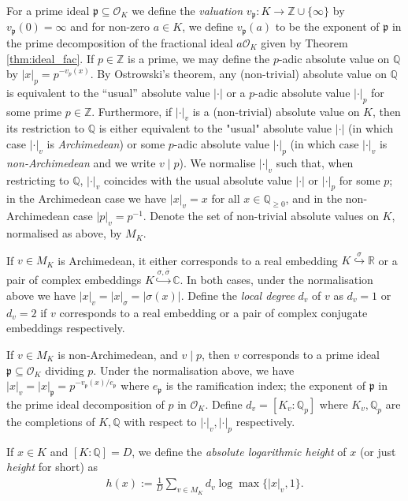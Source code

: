 \documentclass{article}\usepackage[a4paper,margin=20mm]{geometry}
\newcommand{\Q}{\mathbb{Q}}
\newcommand{\p}{\mathfrak{p}}
\newcommand{\Z}{\mathbb{Z}}
\renewcommand{\O}{\mathcal{O}}
\begin{document}
 For a prime ideal $\p \subseteq \O_K$ we define the \emph{valuation} $v_\p : K \to \Z \cup \{\infty\}$ by $v_\p(0) = \infty$ and for non-zero $a \in K$, we define $v_\p(a)$ to be the exponent of $\p$ in the prime decomposition of the fractional ideal $a\O_K$ given by Theorem \ref{thm:ideal_fac}. If $p \in \mathbb Z$ is a prime, we may define the $p$-adic absolute value on $\mathbb Q$ by $|x|_p = p^{-v_p(x)}$. By Ostrowski's theorem, any (non-trivial) absolute value on $\Q$ is equivalent to the ``usual'' absolute value $|\cdot|$ or a $p$-adic absolute value $|\cdot|_p$ for some prime $p \in \Z$. Furthermore, if $|\cdot|_v$ is a (non-trivial) absolute value on $K$, then its restriction to $\Q$ is either equivalent to the "usual" absolute value $|\cdot|$ (in which case $|\cdot|_v$ is \emph{Archimedean}) or some $p$-adic absolute value $|\cdot|_p$ (in which case $|\cdot|_v$ is \emph{non-Archimedean} and we write $v \mid p$). We normalise $|\cdot|_v$ such that, when restricting to $\Q$, $|\cdot|_v$ coincides with the usual absolute value $|\cdot|$ or $|\cdot|_p$ for some $p$; in the Archimedean case we have $|x|_v = x$ for all $x \in \Q_{\geq 0}$, and in the non-Archimedean case $|p|_v = p^{-1}$. Denote the set of non-trivial absolute values on $K$, normalised as above, by $M_K$.

If $v \in M_K$ is Archimedean, it either corresponds to a real embedding $K \overset{\sigma}\hookrightarrow \mathbb R$ or a pair of complex embeddings $K \overset{\sigma,\overline \sigma}\hookrightarrow \mathbb C$. In both cases, under the normalisation above we have $|x|_v = |x|_\sigma = |\sigma(x)|$. Define the \emph{local degree} $d_v$ of $v$ as $d_v = 1$ or $d_v = 2$ if $v$ corresponds to a real embedding or a pair of complex conjugate embeddings respectively.

If $v \in M_K$ is non-Archimedean, and $v \mid p$, then $v$ corresponds to a prime ideal $\p \subseteq \O_K$ dividing $p$. Under the normalisation above, we have $|x|_v = |x|_\p = p^{-v_\p(x)/e_\p}$ where $e_{\p}$ is the ramification index; the exponent of $\p$ in the prime ideal decomposition of $p$ in $\O_K$. Define $d_v = [K_v:\Q_p]$ where $K_v,\Q_p$ are the completions of $K, \Q$ with respect to $|\cdot|_v, |\cdot|_p$ respectively.

If $x \in K$ and $[K:\Q] = D$, we define the \emph{absolute logarithmic height} of $x$ (or just \emph{height} for short) as
\begin{align*}
    h(x) := \frac{1}{D} \sum_{v \in M_K} d_v \log \max\{|x|_v,1\}.
\end{align*}
\end{document}
